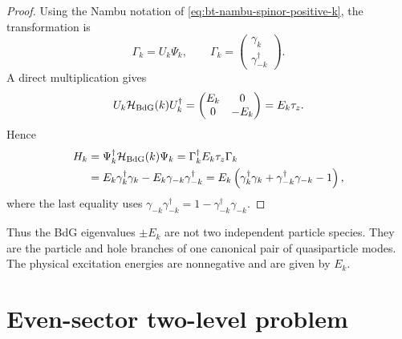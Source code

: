 \begin{proof}
Using the Nambu notation of \cref{eq:bt-nambu-spinor-positive-k}, the
transformation is
\begin{equation}
    \Gamma_k=U_k\Psi_k,
    \qquad
    \Gamma_k=
    \begin{pmatrix}
        \gamma_k\\
        \gamma_{-k}^\dagger
    \end{pmatrix}.
\end{equation}
A direct multiplication gives
\begin{equation}
\label{eq:bt-unitary-diagonalization}
    U_k\mathcal{H}_{\rm BdG}(k)U_k^\dagger
    =
    \begin{pmatrix}
        E_k&0\\
        0&-E_k
    \end{pmatrix}
    =E_k\tau_z.
\end{equation}
Hence
\begin{align}
    H_k
    &
    =\Psi_k^\dagger\mathcal{H}_{\rm BdG}(k)\Psi_k
      =\Gamma_k^\dagger E_k\tau_z\Gamma_k\notag\\
    &
    =E_k\gamma_k^\dagger\gamma_k
     -E_k\gamma_{-k}\gamma_{-k}^\dagger
      =E_k\left(\gamma_k^\dagger\gamma_k+
      \gamma_{-k}^\dagger\gamma_{-k}-1\right),
\end{align}
where the last equality uses
$\gamma_{-k}\gamma_{-k}^\dagger=1-\gamma_{-k}^\dagger\gamma_{-k}$.
\end{proof}

Thus the BdG eigenvalues $\pm E_k$ are not two independent particle species.
They are the particle and hole branches of one canonical pair of quasiparticle
modes.  The physical excitation energies are nonnegative and are given by
$E_k$.

\section{Even-sector two-level problem}
\label{sec:bt-even-sector-two-level}

